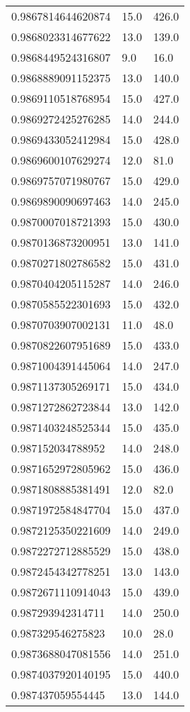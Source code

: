 \begin{center}
\begin{supertabular}[H]{p{0.30\textwidth}p{0.05\textwidth}p{0.05\textwidth}}
0.9867814644620874 & 15.0 & 426.0 \\ 
0.9868023314677622 & 13.0 & 139.0 \\ 
0.9868449524316807 & 9.0 & 16.0 \\ 
0.9868889091152375 & 13.0 & 140.0 \\ 
0.9869110518768954 & 15.0 & 427.0 \\ 
0.9869272425276285 & 14.0 & 244.0 \\ 
0.9869433052412984 & 15.0 & 428.0 \\ 
0.9869600107629274 & 12.0 & 81.0 \\ 
0.9869757071980767 & 15.0 & 429.0 \\ 
0.9869890090697463 & 14.0 & 245.0 \\ 
0.9870007018721393 & 15.0 & 430.0 \\ 
0.9870136873200951 & 13.0 & 141.0 \\ 
0.9870271802786582 & 15.0 & 431.0 \\ 
0.9870404205115287 & 14.0 & 246.0 \\ 
0.9870585522301693 & 15.0 & 432.0 \\ 
0.9870703907002131 & 11.0 & 48.0 \\ 
0.9870822607951689 & 15.0 & 433.0 \\ 
0.9871004391445064 & 14.0 & 247.0 \\ 
0.9871137305269171 & 15.0 & 434.0 \\ 
0.9871272862723844 & 13.0 & 142.0 \\ 
0.9871403248525344 & 15.0 & 435.0 \\ 
0.987152034788952 & 14.0 & 248.0 \\ 
0.9871652972805962 & 15.0 & 436.0 \\ 
0.9871808885381491 & 12.0 & 82.0 \\ 
0.9871972584847704 & 15.0 & 437.0 \\ 
0.9872125350221609 & 14.0 & 249.0 \\ 
0.9872272712885529 & 15.0 & 438.0 \\ 
0.9872454342778251 & 13.0 & 143.0 \\ 
0.9872671110914043 & 15.0 & 439.0 \\ 
0.987293942314711 & 14.0 & 250.0 \\ 
0.987329546275823 & 10.0 & 28.0 \\ 
0.9873688047081556 & 14.0 & 251.0 \\ 
0.9874037920140195 & 15.0 & 440.0 \\ 
0.987437059554445 & 13.0 & 144.0 \\ 

\end{supertabular}
\end{center}
